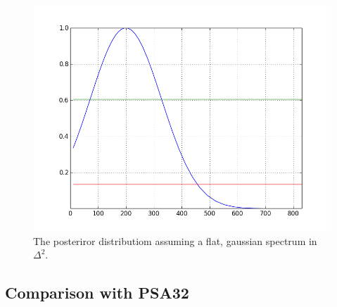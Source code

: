 \documentclass[twocolumn,numberedappendix]{emulateapj} \shorttitle{PSA64}
\begin{document}
\begin{figure}[h!]\centering
\includegraphics[width=\columnwidth]{plots/flat_k3pk_posterior.png}
\caption{The posteriror distributiom assuming a flat, gaussian spectrum in $\Delta^{2}$.}
\label{fig:final_posterioir}
\end{figure}


\subsection{Comparison with PSA32}
%
%
%
\end{document}
